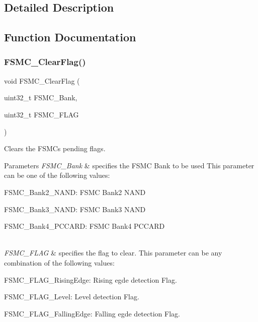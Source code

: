 \subsection{Detailed Description}


\subsection{Function Documentation}
\mbox{\label{group___f_s_m_c___private___functions_ga697618f2de0ad9a8a82461ddbebd5264}} 
\subsubsection{\texorpdfstring{FSMC\_ClearFlag()}{FSMC\_ClearFlag()}}
{\footnotesize\ttfamily void F\+S\+M\+C\+\_\+\+Clear\+Flag (\begin{DoxyParamCaption}\item[{uint32\+\_\+t}]{F\+S\+M\+C\+\_\+\+Bank,  }\item[{uint32\+\_\+t}]{F\+S\+M\+C\+\_\+\+F\+L\+AG }\end{DoxyParamCaption})}



Clears the F\+S\+MC\textquotesingle{}s pending flags. 


\begin{DoxyParams}{Parameters}
{\em F\+S\+M\+C\+\_\+\+Bank} & specifies the F\+S\+MC Bank to be used This parameter can be one of the following values\+: \begin{DoxyItemize}
\item F\+S\+M\+C\+\_\+\+Bank2\+\_\+\+N\+A\+ND\+: F\+S\+MC Bank2 N\+A\+ND \item F\+S\+M\+C\+\_\+\+Bank3\+\_\+\+N\+A\+ND\+: F\+S\+MC Bank3 N\+A\+ND \item F\+S\+M\+C\+\_\+\+Bank4\+\_\+\+P\+C\+C\+A\+RD\+: F\+S\+MC Bank4 P\+C\+C\+A\+RD \end{DoxyItemize}
\\
\hline
{\em F\+S\+M\+C\+\_\+\+F\+L\+AG} & specifies the flag to clear. This parameter can be any combination of the following values\+: \begin{DoxyItemize}
\item F\+S\+M\+C\+\_\+\+F\+L\+A\+G\+\_\+\+Rising\+Edge\+: Rising egde detection Flag. \item F\+S\+M\+C\+\_\+\+F\+L\+A\+G\+\_\+\+Level\+: Level detection Flag. \item F\+S\+M\+C\+\_\+\+F\+L\+A\+G\+\_\+\+Falling\+Edge\+: Falling egde detection Flag. \end{DoxyItemize}
\\
\hline
\end{DoxyParams}

